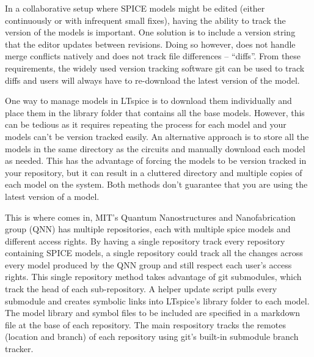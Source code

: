 In a collaborative setup where SPICE models might be edited (either continuously or with infrequent small fixes), 
having the ability to track the version of the models is important. One solution is to include a version 
string that the editor updates between revisions. Doing so however, does not handle merge conflicts natively and
does not track file differences -- ``diffs''. From these requirements, the widely used version tracking software git can be
used to track diffs and users will always have to re-download the latest version of the model.

One way to manage models in LTspice is to download them individually and place them in the library folder that contains 
all the base models. However, this can be tedious as it requires repeating the process for each model and your
models can't be version tracked easily. An alternative
approach is to store all the models in the same directory as the circuits and manually download each model as needed. 
This has the advantage of forcing the models to be version tracked in your repository, but it can result in a cluttered 
directory and multiple copies of each model on the system. Both methods don't guarantee that you are using the latest
version of a model.

This is where  comes in, MIT's Quantum Nanostructures and Nanofabrication group (QNN) has multiple
repositories, each with multiple spice models and different access rights. By having a single repository track every repository containing
SPICE models, a single repository could track all the changes across every model produced by the QNN group and still respect each user's access rights. 
This single repository method takes advantage of git submodules, which track the head of each sub-repository.
A helper update script pulls every submodule and creates symbolic links into LTspice's library folder to each model.
The model library and symbol files to be included are specified in a markdown file at the base of each repository. The main respository tracks the
remotes (location and branch) of each repository using git's built-in submodule branch tracker.

